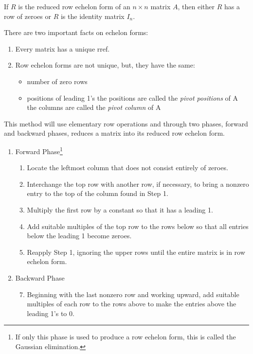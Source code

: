 \documentclass{report}
\begin{document}
		\begin{thm}
			If $R$ is the reduced row echelon form of an $n \times n$ matrix $A$, then either $R$ has a row of zeroes or $R$ is the identity matrix $I_n$.
		\end{thm}
		
		There are two important facts on echelon forms:
		\begin{enumerate}
			\item Every matrix has a unique rref.
			\item Row echelon forms are not unique, but, they have the same:
			\begin{itemize}
				\item number of zero rows
				\item positions of leading 1's
					\subitem the positions are called the \emph{pivot positions} of A
					\subitem the columns are called the \emph{pivot column} of A
			\end{itemize}
		\end{enumerate}
		
		\begin{mthd}\label{mthd_gauss_jordan_elim}
			This method will use elementary row operations and through two phases, forward and backward phases, reduces a matrix into its reduced row echelon form.
			\begin{enumerate}[label=Phase \arabic*.]
				\item Forward Phase\footnote{If only this phase is used to produce a row echelon form, this is called the Gaussian elimination.}
				\begin{enumerate}[label=Step \arabic*.]
					\item Locate the leftmost column that does not consist entirely of zeroes.
					\item Interchange the top row with another row, if necessary, to bring a nonzero entry to the top of the column found in Step 1.
					\item Multiply the first row by a constant so that it has a leading 1.
					\item Add suitable multiples of the top row to the rows below so that all entries below the leading 1 become zeroes.
					\item Reapply Step 1, ignoring the upper rows until the entire matrix is in row echelon form.
				\end{enumerate}
				\item Backward Phase
				\begin{enumerate}[label=Step \arabic*.]
					\setcounter{enumii}{6}
					\item Beginning with the last nonzero row and working upward, add suitable multiples of each row to the rows above to make the entries above the leading 1's to 0.
				\end{enumerate}
			\end{enumerate}
		\end{mthd}
		
\end{document}
